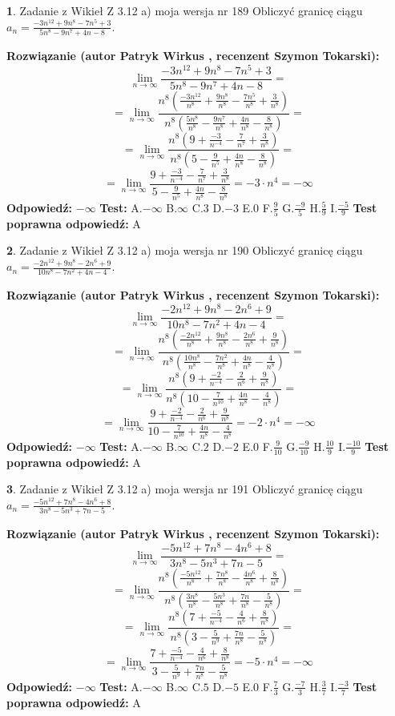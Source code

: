 \documentclass[12pt, a4paper]{article}
\theoremstyle{definition} %
\newtheorem{zad}{}
\newcommand{\zadStart}[1]{\begin{zad}#1\newline}
\newcommand{\zadStop}{\end{zad}}
\newcommand{\rozwStart}[2]{\noindent \textbf{Rozwiązanie (autor #1 , recenzent #2): }\newline}
\newcommand{\rozwStop}{\newline}
\newcommand{\odpStart}{\noindent \textbf{Odpowiedź:}\newline}
\newcommand{\odpStop}{\newline}
\newcommand{\testStart}{\noindent \textbf{Test:}\newline}
\newcommand{\testStop}{\newline}
\newcommand{\kluczStart}{\noindent \textbf{Test poprawna odpowiedź:}\newline}
\newcommand{\kluczStop}{\newline}
\begin{document}
\zadStart{Zadanie z Wikieł Z 3.12 a) moja wersja nr 189}
Obliczyć granicę ciągu $a_{n}=\frac{-3n^{12}+9n^{8}-7n^{5}+3}{5n^{8}-9n^{7}+4n-8}$.
\zadStop
\rozwStart{Patryk Wirkus}{Szymon Tokarski}
$$\lim\limits_{n\to\infty}\frac{-3n^{12}+9n^{8}-7n^{5}+3}{5n^{8}-9n^{7}+4n-8}=$$
$$=\lim\limits_{n\to\infty}\frac{n^{8}\left(\frac{-3n^{12}}{n^{8}}+\frac{9n^{8}}{n^{8}}-\frac{7n^{5}}{n^{8}}+\frac{3}{n^{8}}\right)}{n^{8}\left(\frac{5n^{8}}{n^{8}}-\frac{9n^{7}}{n^{8}}+\frac{4n}{n^{8}}-\frac{8}{n^{8}}\right)}=$$
$$=\lim\limits_{n\to\infty}\frac{n^{8}\left(9+\frac{-3}{n^{-4}}-\frac{7}{n^{7}}+\frac{3}{n^{8}}\right)}
{n^{8}\left(5-\frac{9}{n^{5}}+\frac{4n}{n^{8}}-\frac{8}{n^{8}}\right)}=$$
$$=\lim\limits_{n\to\infty}\frac{9+\frac{-3}{n^{-4}}-\frac{7}{n^{7}}+\frac{3}{n^{8}}}{5-\frac{9}{n^{5}}+\frac{4n}{n^{8}}-\frac{8}{n^{8}}}=-3\cdot n^{4} = -\infty$$
\rozwStop
\odpStart
$-\infty$
\odpStop
\testStart
A.$-\infty$
B.$\infty$
C.$3$
D.$-3$
E.$0$
F.$\frac{9}{5}$
G.$\frac{-9}{5}$
H.$\frac{5}{9}$
I.$\frac{-5}{9}$
\testStop
\kluczStart
A
\kluczStop



\zadStart{Zadanie z Wikieł Z 3.12 a) moja wersja nr 190}
Obliczyć granicę ciągu $a_{n}=\frac{-2n^{12}+9n^{8}-2n^{6}+9}{10n^{8}-7n^{2}+4n-4}$.
\zadStop
\rozwStart{Patryk Wirkus}{Szymon Tokarski}
$$\lim\limits_{n\to\infty}\frac{-2n^{12}+9n^{8}-2n^{6}+9}{10n^{8}-7n^{2}+4n-4}=$$
$$=\lim\limits_{n\to\infty}\frac{n^{8}\left(\frac{-2n^{12}}{n^{8}}+\frac{9n^{8}}{n^{8}}-\frac{2n^{6}}{n^{8}}+\frac{9}{n^{8}}\right)}{n^{8}\left(\frac{10n^{8}}{n^{8}}-\frac{7n^{2}}{n^{8}}+\frac{4n}{n^{8}}-\frac{4}{n^{8}}\right)}=$$
$$=\lim\limits_{n\to\infty}\frac{n^{8}\left(9+\frac{-2}{n^{-4}}-\frac{2}{n^{6}}+\frac{9}{n^{8}}\right)}
{n^{8}\left(10-\frac{7}{n^{10}}+\frac{4n}{n^{8}}-\frac{4}{n^{8}}\right)}=$$
$$=\lim\limits_{n\to\infty}\frac{9+\frac{-2}{n^{-4}}-\frac{2}{n^{6}}+\frac{9}{n^{8}}}{10-\frac{7}{n^{10}}+\frac{4n}{n^{8}}-\frac{4}{n^{8}}}=-2\cdot n^{4} = -\infty$$
\rozwStop
\odpStart
$-\infty$
\odpStop
\testStart
A.$-\infty$
B.$\infty$
C.$2$
D.$-2$
E.$0$
F.$\frac{9}{10}$
G.$\frac{-9}{10}$
H.$\frac{10}{9}$
I.$\frac{-10}{9}$
\testStop
\kluczStart
A
\kluczStop



\zadStart{Zadanie z Wikieł Z 3.12 a) moja wersja nr 191}
Obliczyć granicę ciągu $a_{n}=\frac{-5n^{12}+7n^{8}-4n^{6}+8}{3n^{8}-5n^{3}+7n-5}$.
\zadStop
\rozwStart{Patryk Wirkus}{Szymon Tokarski}
$$\lim\limits_{n\to\infty}\frac{-5n^{12}+7n^{8}-4n^{6}+8}{3n^{8}-5n^{3}+7n-5}=$$
$$=\lim\limits_{n\to\infty}\frac{n^{8}\left(\frac{-5n^{12}}{n^{8}}+\frac{7n^{8}}{n^{8}}-\frac{4n^{6}}{n^{8}}+\frac{8}{n^{8}}\right)}{n^{8}\left(\frac{3n^{8}}{n^{8}}-\frac{5n^{3}}{n^{8}}+\frac{7n}{n^{8}}-\frac{5}{n^{8}}\right)}=$$
$$=\lim\limits_{n\to\infty}\frac{n^{8}\left(7+\frac{-5}{n^{-4}}-\frac{4}{n^{6}}+\frac{8}{n^{8}}\right)}
{n^{8}\left(3-\frac{5}{n^{9}}+\frac{7n}{n^{8}}-\frac{5}{n^{8}}\right)}=$$
$$=\lim\limits_{n\to\infty}\frac{7+\frac{-5}{n^{-4}}-\frac{4}{n^{6}}+\frac{8}{n^{8}}}{3-\frac{5}{n^{9}}+\frac{7n}{n^{8}}-\frac{5}{n^{8}}}=-5\cdot n^{4} = -\infty$$
\rozwStop
\odpStart
$-\infty$
\odpStop
\testStart
A.$-\infty$
B.$\infty$
C.$5$
D.$-5$
E.$0$
F.$\frac{7}{3}$
G.$\frac{-7}{3}$
H.$\frac{3}{7}$
I.$\frac{-3}{7}$
\testStop
\kluczStart
A
\kluczStop
\end{document}
